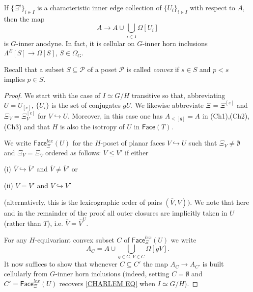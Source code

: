\documentclass[a4paper,10pt
,draft
]{article}%
\begin{document}
\begin{lemma}\label{CHAREDGE LEM}
If $\{\Xi^i\}_{i \in I}$ is a characteristic inner edge collection of $\{U_i\}_{i\in I}$ with respect to $A$, then the map
	\begin{equation}\label{CHARLEM EQ}
		A \to A \cup \bigcup_{i \in I} \Omega[U_i]
	\end{equation}
is $G$-inner anodyne. In fact, it is cellular on $G$-inner horn inclusions $\Lambda^E[S] \to \Omega[S]$, $S \in \Omega_G$.
\end{lemma}

Recall that a subset $S \subseteq \mathcal{P}$ of a poset $\mathcal{P}$ is called \textit{convex} if $s \in S$ and 
$p<s$ implies $p \in S$.

\begin{proof}
We start with the case of $I \simeq G/H$ transitive so that, abbreviating $U = U_{[e]}$, $\{U_i\}$ is the set of conjugates $gU$. 
We likewise abbreviate $\Xi = \Xi^{[e]}$ and
$\Xi_V = \Xi_V^{[e]}$ for $V \hookrightarrow U$.
Moreover, in this case one has $A_{<[g]}=A$ in (Ch1),(Ch2),(Ch3) and that $H$ is also the isotropy of $U$ in $\mathsf{Face}(T)$.

We write $\mathsf{Face}_{\Xi}^{lex}(U)$
for the $H$-poset of planar faces $V \hookrightarrow U$
such that $\Xi_V \neq \emptyset$ and $\Xi_V = \Xi_{\bar{V}}$
ordered as follows: 
$V \leq V'$ if either
	\begin{inparaenum}
		\item[(i)] $\bar{V} \hookrightarrow \bar{V}'$ and 
		$\bar{V} \neq \bar{V}'$ or
		\item[(ii)] $\bar{V} = \bar{V}'$ and
		$V \hookrightarrow V'$
	\end{inparaenum}
(alternatively, this is the lexicographic order of pairs $(\bar{V},V))$.
We note that here and in the remainder of the proof all outer closures are implicitly taken in $U$ (rather than $T$), i.e. 
$\bar{V}=\bar{V}^U$.

For any $H$-equivariant convex subset $C$ of $\mathsf{Face}_{\Xi}^{lex}(U)$ we write
\[
A_C = 
A \cup \bigcup_{g\in G,V \in C} \Omega[gV].
\]
It now suffices to show that whenever
$C \subseteq C'$
the map 
$A_C \to A_{C'}$ is built cellularly from 
$G$-inner horn inclusions
(indeed, setting $C=\emptyset$ and 
$C'=\mathsf{Face}_{\Xi}^{lex}(U)$ recovers \eqref{CHARLEM EQ}
when $I \simeq G/H$).


\end{proof}
\end{document}
